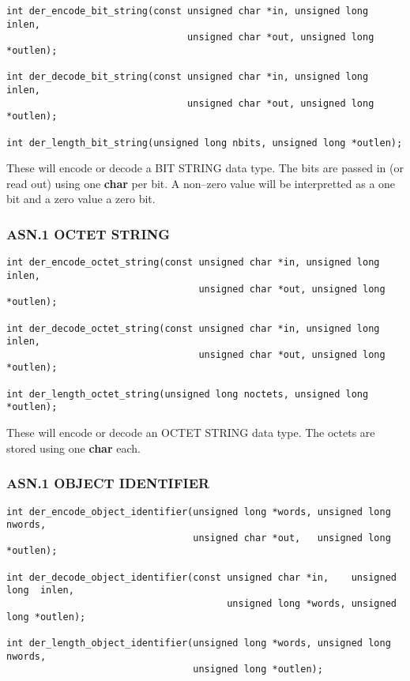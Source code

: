 \documentclass[a4paper]{book}
\begin{document}
\begin{verbatim}
int der_encode_bit_string(const unsigned char *in, unsigned long inlen,
                                unsigned char *out, unsigned long *outlen);

int der_decode_bit_string(const unsigned char *in, unsigned long inlen,
                                unsigned char *out, unsigned long *outlen);

int der_length_bit_string(unsigned long nbits, unsigned long *outlen);
\end{verbatim}

These will encode or decode a BIT STRING data type.  The bits are passed in (or read out) using one \textbf{char} per bit.  A non--zero value will be interpretted
as a one bit and a zero value a zero bit.

\subsubsection{ASN.1 OCTET STRING}

\begin{verbatim}
int der_encode_octet_string(const unsigned char *in, unsigned long inlen,
                                  unsigned char *out, unsigned long *outlen);

int der_decode_octet_string(const unsigned char *in, unsigned long inlen,
                                  unsigned char *out, unsigned long *outlen);

int der_length_octet_string(unsigned long noctets, unsigned long *outlen);
\end{verbatim}

These will encode or decode an OCTET STRING data type.  The octets are stored using one \textbf{char} each.  

\subsubsection{ASN.1 OBJECT IDENTIFIER}

\begin{verbatim}
int der_encode_object_identifier(unsigned long *words, unsigned long  nwords,
                                 unsigned char *out,   unsigned long *outlen);

int der_decode_object_identifier(const unsigned char *in,    unsigned long  inlen,
                                       unsigned long *words, unsigned long *outlen);

int der_length_object_identifier(unsigned long *words, unsigned long nwords, 
                                 unsigned long *outlen);
\end{verbatim}
\end{document}
